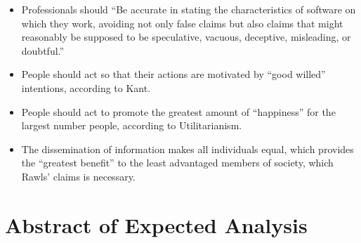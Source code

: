 \documentclass[11pt]{article}
\begin{document}
\begin{itemize}
\item Professionals should ``Be accurate in stating the characteristics of software on which they work, avoiding not only false claims but also claims that might reasonably be supposed to be speculative, vacuous, deceptive, misleading, or doubtful.'' \cite{secode}
\item People should act so that their actions are motivated by ``good willed'' intentions, according to Kant. \cite{kant}
\item People should act to promote the greatest amount of ``happiness'' for the largest number people, according to Utilitarianism. \cite{util}
\item The dissemination of information makes all individuals equal, which provides the ``greatest benefit'' to the least advantaged members of society, which Rawls' claims is necessary. \cite{rawls}
\end{itemize}

\section{Abstract of Expected Analysis}


\end{document}
